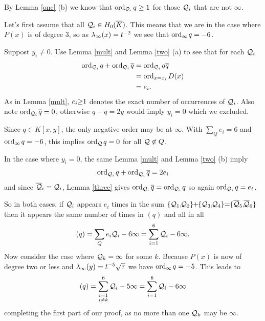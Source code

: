 \documentclass[english,11pt,a4paper]{article}
\begin{document}
By Lemma \ref{one} (b) we know that $\text{ord}_{\mathcal{Q}_i}\hspace{0.4mm} q \geq 1$ for those $\mathcal{Q}_i$ that are not $\infty$.

Let's first assume that all $\mathcal{Q}_i \in H_0(\overline K)$. This means that we are in the case where $P(x)$ is of degree 3, so as $\lambda_{\infty} (x) = t^{-2}$ we see that $\text{ord}_{\infty}\hspace{0.4mm} q = -6$.

Suppost $y_i \neq 0$. Use Lemma \ref{mult} and Lemma \ref{two} (a) to see that for each $\mathcal{Q}_i$
\begin{align*}
  \text{ord}_{\mathcal{Q}_i}\hspace{0.4mm} q + \text{ord}_{\mathcal{Q}_i}\hspace{0.4mm} \overline q &= \text{ord}_{\mathcal{Q}_i}\hspace{0.4mm} q \overline q\\
                  &= \text{ord}_{x=x_i}\hspace{0.4mm} D(x)\\
                  &= e_i.
\end{align*}
As in Lemma \ref{mult}, $e_i \hspace{-1mm}\geq\hspace{-1mm} 1$ denotes the exact number of occurrences of $\mathcal{Q}_i$. Also note $\text{ord}_{\mathcal{Q}_i}\hspace{0.4mm} \overline q = 0$, otherwise $q - \bar q = 2y$ would imply $y_i = 0$ which we excluded.

Since $q \in K[x,y]$, the only negative order may be at $\infty$. With $\sum_Q e_i = 6$ and $\text{ord}_{\infty}\hspace{0.4mm} q = -6$, this implies $\text{ord}_{\mathcal{Q}}\hspace{0.4mm} q = 0$ for all $\mathcal{Q} \not \in Q$.%


In the case where $y_i = 0$, the same Lemma \ref{mult} and Lemma \ref{two} (b) imply
\begin{align*}
  \text{ord}_{\mathcal{Q}_i}\hspace{0.4mm} q + \text{ord}_{\mathcal{Q}_i}\hspace{0.4mm} \overline q = 2e_i
\end{align*}
and since $\overline {\mathcal{Q}}_i = \mathcal{Q}_i$, Lemma \ref{three} gives $\text{ord}_{\mathcal{Q}_i}\hspace{0.4mm} \overline q = \text{ord}_{\mathcal{Q}_i}\hspace{0.4mm} q$ so again $\text{ord}_{\mathcal{Q}_i}\hspace{0.4mm} q = e_i$.

So in both cases, if $\mathcal{Q}_i$ appears $e_i$ times in the sum $\{ \q_1 ,\hspace{-1mm} \q_2\}\hspace{-1mm}+\hspace{-1mm}\{\q_3 ,\hspace{-1mm} \q_4\} \hspace{-1mm}=\hspace{-1mm} \{\bar \q_5 ,\hspace{-1mm} \bar \q_6 \}$ then it appears the same number of times in $(q)$ and all in all
\begin{align*}
  (q) = \sum_Q e_i \mathcal{Q}_i - 6 \infty = \sum_{i=1}^6 \mathcal{Q}_i - 6 \infty.
\end{align*}
Now consider the case where $\mathcal{Q}_k = \infty$ for some $k$. Because $P(x)$ is now of degree two or less and $\lambda_{\infty}(y) = t^{-5}\sqrt \tau$ we have $\text{ord}_{\infty}\hspace{0.4mm} q = -5$. This leads to
\begin{align*}
  (q) = \sum_{\substack{i=1 \\ i \neq k}}^6 \mathcal{Q}_i - 5 \infty = \sum_{i=1}^6 \mathcal{Q}_i - 6 \infty
\end{align*}
completing the first part of our proof, as no more than one $\mathcal{Q}_k$ may be $\infty$.
\end{document}
